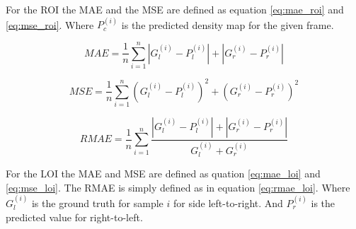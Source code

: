 For the ROI the MAE and the MSE are defined as equation \ref{eq:mae_roi} and \ref{eq:mse_roi}. Where $P_c^{(i)}$ is the predicted density map for the given frame.

\begin{equation}
\label{eq:mae_loi}
	MAE = \frac{1}{n}\sum^n_{i=1}|G_l^{(i)}-P_l^{(i)}|+|G_r^{(i)}-P_r^{(i)}|
\end{equation}

\begin{equation}
\label{eq:mse_loi}
	MSE = \frac{1}{n}\sum^n_{i=1}(G_l^{(i)}-P_l^{(i)})^2+(G_r^{(i)}-P_r^{(i)})^2
\end{equation}

\begin{equation}
\label{eq:rmae_loi}
	RMAE = \frac{1}{n}\sum^n_{i=1}\frac{|G_l^{(i)}-P_l^{(i)}|+|G_r^{(i)}-P_r^{(i)}|}{G_l^{(i)} + G_r^{(i)}}
\end{equation}

For the LOI the MAE and MSE are defined as quation \ref{eq:mae_loi} and \ref{eq:mse_loi}. The RMAE is simply defined as in equation \ref{eq:rmae_loi}. Where $G_l^{(i)}$ is the ground truth for sample $i$ for side left-to-right. And $P_r^{(i)}$ is the predicted value for right-to-left.
